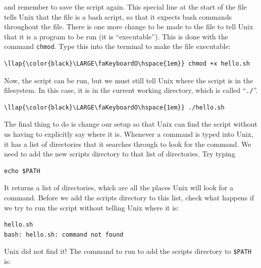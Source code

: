 \documentclass[11pt]{article}
\begin{document}
and remember to save the script again. This special line at the start of
the file tells Unix that the file is a bash script, so that it expects
bash commands throughout the file. There is one more change to be made
to the file to tell Unix that it is a program to be run (it is
``executable''). This is done with the command \texttt{chmod}. Type this
into the terminal to make the file executable:

\begin{terminalinput}
\begin{Verbatim}[commandchars=\\\{\}]
\llap{\color{black}\LARGE\faKeyboardO\hspace{1em}} chmod +x hello.sh
\end{Verbatim}
\end{terminalinput}

    Now, the script can be run, but we must still tell Unix where the script
is in the filesystem. In this case, it is in the current working
directory, which is called ``\texttt{./}''.

\begin{terminalinput}
\begin{Verbatim}[commandchars=\\\{\}]
\llap{\color{black}\LARGE\faKeyboardO\hspace{1em}} ./hello.sh
\end{Verbatim}
\end{terminalinput}

    The final thing to do is change our setup so that Unix can find the
script without us having to explicitly say where it is. Whenever a
command is typed into Unix, it has a list of directories that it
searches through to look for the command. We need to add the new scripts
directory to that list of directories. Try typing

\begin{verbatim}
echo $PATH
\end{verbatim}

It returns a list of directories, which are all the places Unix will
look for a command. Before we add the scripts directory to this list,
check what happens if we try to run the script without telling Unix
where it is:

\begin{verbatim}
hello.sh
bash: hello.sh: command not found
\end{verbatim}

Unix did not find it! The command to run to add the scripts directory to
\texttt{\$PATH} is:
\end{document}
